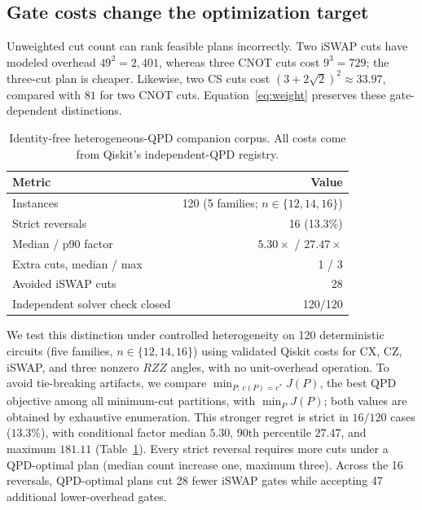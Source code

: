 \documentclass[
  aps,
  pra,
  reprint,
  amsmath,
  amssymb,
  longbibliography,
  nofootinbib,
  floatfix
]{revtex4-2}
\theoremstyle{plain}
\newcommand{\tabfit}[1]{{\footnotesize #1}}
\begin{document}
\subsection{Gate costs change the optimization target}
\label{sec:results-count}

Unweighted cut count can rank feasible plans incorrectly. Two iSWAP cuts have modeled overhead $49^2=2{,}401$, whereas three CNOT cuts cost $9^3=729$; the three-cut plan is cheaper. Likewise, two CS cuts cost $(3+2\sqrt{2})^2\approx33.97$, compared with $81$ for two CNOT cuts. Equation~\eqref{eq:weight} preserves these gate-dependent distinctions.

\begin{table}[t]
\centering
\caption{Identity-free heterogeneous-QPD companion corpus. All costs come from Qiskit's independent-QPD registry.}
\label{tab:heterogeneous}
\tabfit{%
\begin{tabular}{lr}
\toprule
\textbf{Metric} & \textbf{Value}\\
\midrule
Instances & 120 (5 families; $n\in\{12,14,16\}$)\\
Strict reversals & 16 (13.3\%)\\
Median / p90 factor & $5.30\times$ / $27.47\times$\\
Extra cuts, median / max & 1 / 3\\
Avoided iSWAP cuts & 28\\
Independent solver check closed & 120/120\\
\bottomrule
\end{tabular}
}
\end{table}

We test this distinction under controlled heterogeneity on 120 deterministic circuits (five families, $n\in\{12,14,16\}$) using validated Qiskit costs for CX, CZ, iSWAP, and three nonzero $RZZ$ angles, with no unit-overhead operation. To avoid tie-breaking artifacts, we compare $\min_{P:\,c(P)=c^*}J(P)$, the best QPD objective among all minimum-cut partitions, with $\min_PJ(P)$; both values are obtained by exhaustive enumeration. This stronger regret is strict in $16/120$ cases ($13.3\%$), with conditional factor median $5.30$, 90th percentile $27.47$, and maximum $181.11$ (Table~\ref{tab:heterogeneous}). Every strict reversal requires more cuts under a QPD-optimal plan (median count increase one, maximum three). Across the 16 reversals, QPD-optimal plans cut 28 fewer iSWAP gates while accepting 47 additional lower-overhead gates.
\end{document}
